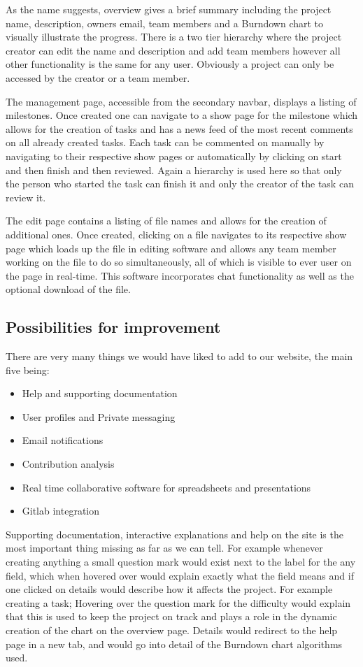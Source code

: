 \documentclass[a4wide, 11pt]{article}
\begin{document}
As the name suggests, overview gives a brief summary including the project name, description, owners email, team members and a Burndown chart to visually illustrate the progress. There is a two tier hierarchy where the project creator can edit the name and description and add team members however all other functionality is the same for any user. Obviously a project can only be accessed by the creator or a team member. 

The management page, accessible from the secondary navbar, displays a listing of milestones. Once created one can navigate to a show page for the milestone which allows for the creation of tasks and has a news feed of the most recent comments on all already created tasks. Each task can be commented on manually by navigating to their respective show pages or automatically by clicking on start and then finish and then reviewed. Again a hierarchy is used here so that only the person who started the task can finish it and only the creator of the task can review it.

The edit page contains a listing of file names and allows for the creation of additional ones. Once created, clicking on a file navigates to its respective show page which loads up the file in editing software and allows any team member working on the file to do so simultaneously, all of which is visible to ever user on the page in real-time. This software incorporates chat functionality as well as the optional download of the file. 

\subsection{Possibilities for improvement}
There are very many things we would have liked to add to our website, the main five being:
\begin{itemize}
  \item Help and supporting documentation
  \item User profiles and Private messaging
  \item Email notifications
  \item Contribution analysis
  \item Real time collaborative software for spreadsheets and presentations
  \item Gitlab integration
\end{itemize}

Supporting documentation, interactive explanations and help on the site is the most important thing missing as far as we can tell. For example whenever creating anything a small question mark would exist next to the label for the any field, which when hovered over would explain exactly what the field means and if one clicked on details would describe how it affects the project. For example creating a task; Hovering over the question mark for the difficulty would explain that this is used to keep the project on track and plays a role in the dynamic creation of the chart on the overview page. Details would redirect to the help page in a new tab, and would go into detail of the Burndown chart algorithms used.
\end{document}
